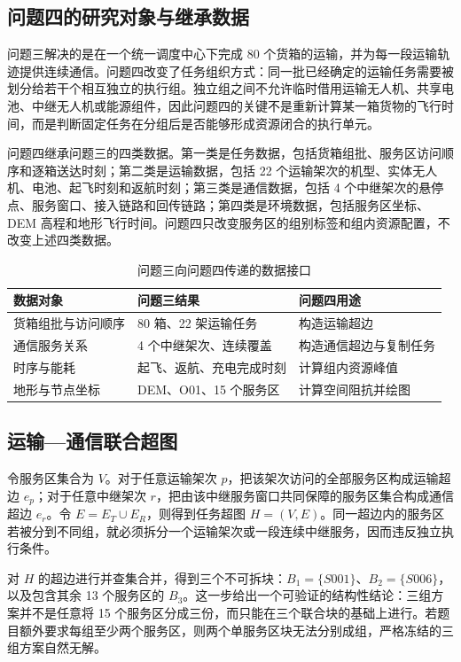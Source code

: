 \documentclass[UTF8,a4paper,12pt]{ctexart}
\begin{document}
\subsection{问题四的研究对象与继承数据}
问题三解决的是在一个统一调度中心下完成 80 个货箱的运输，并为每一段运输轨迹提供连续通信。问题四改变了任务组织方式：同一批已经确定的运输任务需要被划分给若干个相互独立的执行组。独立组之间不允许临时借用运输无人机、共享电池、中继无人机或能源组件，因此问题四的关键不是重新计算某一箱货物的飞行时间，而是判断固定任务在分组后是否能够形成资源闭合的执行单元。

问题四继承问题三的四类数据。第一类是任务数据，包括货箱组批、服务区访问顺序和逐箱送达时刻；第二类是运输数据，包括 22 个运输架次的机型、实体无人机、电池、起飞时刻和返航时刻；第三类是通信数据，包括 4 个中继架次的悬停点、服务窗口、接入链路和回传链路；第四类是环境数据，包括服务区坐标、DEM 高程和地形飞行时间。问题四只改变服务区的组别标签和组内资源配置，不改变上述四类数据。

\begin{table}[H]\centering\caption{问题三向问题四传递的数据接口}
\begin{tabular}{lll}\toprule
数据对象&问题三结果&问题四用途\\\midrule
货箱组批与访问顺序&80 箱、22 架运输任务&构造运输超边\\
通信服务关系&4 个中继架次、连续覆盖&构造通信超边与复制任务\\
时序与能耗&起飞、返航、充电完成时刻&计算组内资源峰值\\
地形与节点坐标&DEM、O01、15 个服务区&计算空间阻抗并绘图\\\bottomrule
\end{tabular}\end{table}

\subsection{运输—通信联合超图}
令服务区集合为 $V$。对于任意运输架次 $p$，把该架次访问的全部服务区构成运输超边 $e_p$；对于任意中继架次 $r$，把由该中继服务窗口共同保障的服务区集合构成通信超边 $e_r$。令 $E=E_T\cup E_R$，则得到任务超图 $H=(V,E)$。同一超边内的服务区若被分到不同组，就必须拆分一个运输架次或一段连续中继服务，因而违反独立执行条件。

对 $H$ 的超边进行并查集合并，得到三个不可拆块：$B_1=\{S001\}$、$B_2=\{S006\}$，以及包含其余 13 个服务区的 $B_3$。这一步给出一个可验证的结构性结论：三组方案并不是任意将 15 个服务区分成三份，而只能在三个联合块的基础上进行。若题目额外要求每组至少两个服务区，则两个单服务区块无法分别成组，严格冻结的三组方案自然无解。
\end{document}
